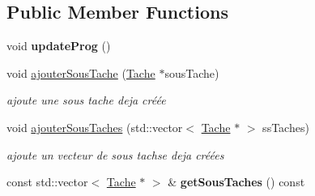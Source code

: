 \subsection*{Public Member Functions}
\begin{DoxyCompactItemize}
\item 
\hypertarget{class_tache_composite_ab7316533b8fbec7443a9ff2c33c69f86}{}void {\bfseries update\+Prog} ()\label{class_tache_composite_ab7316533b8fbec7443a9ff2c33c69f86}

\item 
void \hyperlink{class_tache_composite_a60c7332b9e4b6f162b9a4830b5260d33}{ajouter\+Sous\+Tache} (\hyperlink{class_tache}{Tache} $\ast$sous\+Tache)
\begin{DoxyCompactList}\small\item\em ajoute une sous tache deja créée \end{DoxyCompactList}\item 
void \hyperlink{class_tache_composite_a31b559ef0a8ec1eea5c7d68b11abd44a}{ajouter\+Sous\+Taches} (std\+::vector$<$ \hyperlink{class_tache}{Tache} $\ast$ $>$ ss\+Taches)
\begin{DoxyCompactList}\small\item\em ajoute un vecteur de sous tachse deja créées \end{DoxyCompactList}\item 
\hypertarget{class_tache_composite_ada263b48d9db1efae0bd77b43adf214a}{}const std\+::vector$<$ \hyperlink{class_tache}{Tache} $\ast$ $>$ \& {\bfseries get\+Sous\+Taches} () const \label{class_tache_composite_ada263b48d9db1efae0bd77b43adf214a}


\end{DoxyCompactItemize}
